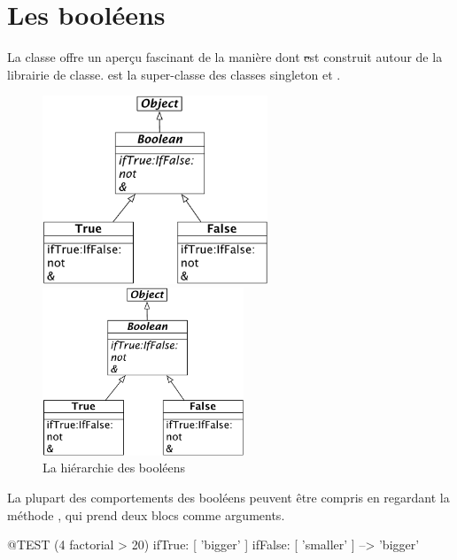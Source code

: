 \documentclass[a4paper,10pt,twoside]{book}
\begin{document}

\section{Les bool\'eens}

La classe  offre un aper\c{c}u fascinant de la mani\`ere dont \st est construit autour de la librairie de classe. 
 est la super-classe  des classes singleton   et .

\begin{figure}[ht]
\ifluluelse
	{\centerline {\includegraphics[width=0.6\textwidth]{BooleanHierarchy}}}
	{\centerline {\includegraphics[width=6cm]{BooleanHierarchy}}}
\caption{La hi\'erarchie des bool\'eens \label{fig:booleans}}
\end{figure}

La plupart des comportements des bool\'eens peuvent \^etre compris en regardant la m\'ethode , qui prend deux blocs comme arguments.

\begin{code}{@TEST}
(4 factorial > 20) ifTrue: [ 'bigger' ] ifFalse: [ 'smaller' ] --> 'bigger'
\end{code}
\end{document}
